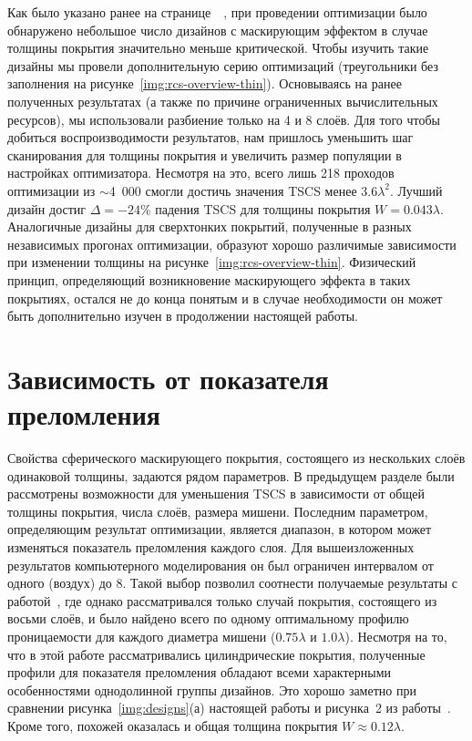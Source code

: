 Как было указано ранее на
странице~\pageref{backref:thin-designs}~\label{ref:thin-designs}, при
проведении оптимизации было обнаружено небольшое число дизайнов с
маскирующим эффектом в случае толщины покрытия значительно меньше
критической.  Чтобы изучить такие дизайны мы провели дополнительную
серию оптимизаций (треугольники без заполнения на
рисунке~\ref{img:rcs-overview-thin}).  Основываясь на ранее полученных
результатах (а также по причине ограниченных вычислительных ресурсов),
мы использовали разбиение только на 4 и 8 слоёв.  Для того чтобы
добиться воспроизводимости результатов, нам пришлось уменьшить шаг
сканирования для толщины покрытия и увеличить размер популяции в
настройках оптимизатора.  Несмотря на это, всего лишь 218 проходов
оптимизации из $\sim$4~000 смогли достичь значения TSCS менее
$3.6\lambda^2$.  Лучший дизайн достиг $\Delta = -24\%$ падения TSCS для толщины
покрытия $W=0.043\lambda$.  Аналогичные дизайны для сверхтонких
покрытий, полученные в разных независимых прогонах оптимизации,
образуют хорошо различимые зависимости при изменении толщины на
рисунке~\ref{img:rcs-overview-thin}.  Физический принцип, определяющий
возникновение маскирующего эффекта в таких покрытиях, остался не до
конца понятым и в случае необходимости он может быть дополнительно
изучен в продолжении настоящей работы.


\section{Зависимость от показателя преломления}

Свойства сферического маскирующего покрытия, состоящего из нескольких
слоёв одинаковой толщины, задаются рядом параметров. В предыдущем
разделе были рассмотрены возможности для уменьшения TSCS в зависимости
от общей толщины покрытия, числа слоёв, размера мишени. Последним
параметром, определяющим результат оптимизации, является диапазон, в
котором может изменяться показатель преломления каждого слоя.  Для
вышеизложенных результатов компьютерного моделирования он был
ограничен интервалом от одного (воздух) до $8$.  Такой выбор позволил
соотнести получаемые результаты с работой~\cite{semouchkina2}, где
однако рассматривался только случай покрытия, состоящего из восьми
слоёв, и было найдено всего по одному оптимальному профилю
проницаемости для каждого диаметра мишени ($0.75\lambda$ и
$1.0\lambda$). Несмотря на то, что в этой работе рассматривались
цилиндрические покрытия, полученные профили для показателя преломления
обладают всеми характерными особенностями однодолинной группы
дизайнов. Это хорошо заметно при сравнении
рисунка~\ref{img:designs}(а) настоящей работы и рисунка~2 из
работы~\cite{semouchkina2}. Кроме того, похожей оказалась и общая
толщина покрытия $W\approx 0.12\lambda$.

